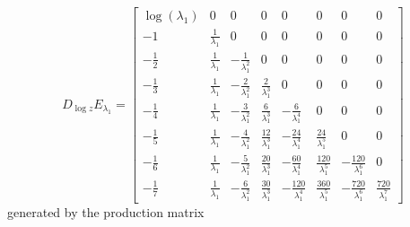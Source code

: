 \iffalse %
\begin{displaymath}
D_{\log{z}}E_{\lambda_{1}} = \left[\begin{matrix}\log{\left (\lambda_{1} \right )} & 0 & 0 & 0 & 0 & 0 & 0 & 0\\-1 & \frac{1}{\lambda_{1}} & 0 & 0 & 0 & 0 & 0 & 0\\- \frac{1}{2} & \frac{1}{\lambda_{1}} & - \frac{1}{\lambda_{1}^{2}} & 0 & 0 & 0 & 0 & 0\\- \frac{1}{3} & \frac{1}{\lambda_{1}} & - \frac{2}{\lambda_{1}^{2}} & \frac{2}{\lambda_{1}^{3}} & 0 & 0 & 0 & 0\\- \frac{1}{4} & \frac{1}{\lambda_{1}} & - \frac{3}{\lambda_{1}^{2}} & \frac{6}{\lambda_{1}^{3}} & - \frac{6}{\lambda_{1}^{4}} & 0 & 0 & 0\\- \frac{1}{5} & \frac{1}{\lambda_{1}} & - \frac{4}{\lambda_{1}^{2}} & \frac{12}{\lambda_{1}^{3}} & - \frac{24}{\lambda_{1}^{4}} & \frac{24}{\lambda_{1}^{5}} & 0 & 0\\- \frac{1}{6} & \frac{1}{\lambda_{1}} & - \frac{5}{\lambda_{1}^{2}} & \frac{20}{\lambda_{1}^{3}} & - \frac{60}{\lambda_{1}^{4}} & \frac{120}{\lambda_{1}^{5}} & - \frac{120}{\lambda_{1}^{6}} & 0\\- \frac{1}{7} & \frac{1}{\lambda_{1}} & - \frac{6}{\lambda_{1}^{2}} & \frac{30}{\lambda_{1}^{3}} & - \frac{120}{\lambda_{1}^{4}} & \frac{360}{\lambda_{1}^{5}} & - \frac{720}{\lambda_{1}^{6}} & \frac{720}{\lambda_{1}^{7}}\end{matrix}\right]
\end{displaymath}
generated by the production matrix
